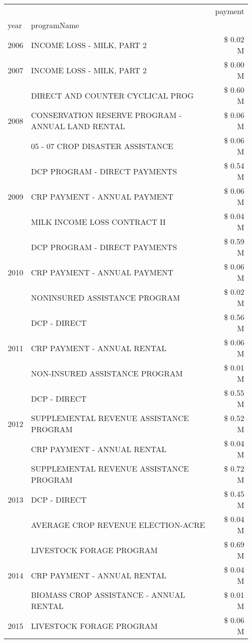 \begin{tabular}{llr}
\toprule
 &  & payment \\
year & programName &  \\
\midrule
2006 & INCOME LOSS - MILK, PART 2 & \$ 0.02 M \\
\cline{1-3}
2007 & INCOME LOSS - MILK, PART 2 & \$ 0.00 M \\
\cline{1-3}
\multirow[t]{3}{*}{2008} & DIRECT AND COUNTER CYCLICAL PROG & \$ 0.60 M \\
 & CONSERVATION RESERVE PROGRAM - ANNUAL LAND RENTAL & \$ 0.06 M \\
 & 05 - 07 CROP DISASTER ASSISTANCE & \$ 0.06 M \\
\cline{1-3}
\multirow[t]{3}{*}{2009} & DCP PROGRAM - DIRECT PAYMENTS & \$ 0.54 M \\
 & CRP PAYMENT - ANNUAL PAYMENT & \$ 0.06 M \\
 & MILK INCOME LOSS CONTRACT II & \$ 0.04 M \\
\cline{1-3}
\multirow[t]{3}{*}{2010} & DCP PROGRAM - DIRECT PAYMENTS & \$ 0.59 M \\
 & CRP PAYMENT - ANNUAL PAYMENT & \$ 0.06 M \\
 & NONINSURED ASSISTANCE PROGRAM & \$ 0.02 M \\
\cline{1-3}
\multirow[t]{3}{*}{2011} & DCP - DIRECT & \$ 0.56 M \\
 & CRP PAYMENT - ANNUAL RENTAL & \$ 0.06 M \\
 & NON-INSURED ASSISTANCE PROGRAM & \$ 0.01 M \\
\cline{1-3}
\multirow[t]{3}{*}{2012} & DCP - DIRECT & \$ 0.55 M \\
 & SUPPLEMENTAL REVENUE ASSISTANCE PROGRAM & \$ 0.52 M \\
 & CRP PAYMENT - ANNUAL RENTAL & \$ 0.04 M \\
\cline{1-3}
\multirow[t]{3}{*}{2013} & SUPPLEMENTAL REVENUE ASSISTANCE PROGRAM & \$ 0.72 M \\
 & DCP - DIRECT & \$ 0.45 M \\
 & AVERAGE CROP REVENUE ELECTION-ACRE & \$ 0.04 M \\
\cline{1-3}
\multirow[t]{3}{*}{2014} & LIVESTOCK FORAGE PROGRAM & \$ 0.69 M \\
 & CRP PAYMENT - ANNUAL RENTAL & \$ 0.04 M \\
 & BIOMASS CROP ASSISTANCE - ANNUAL RENTAL & \$ 0.01 M \\
\cline{1-3}
\multirow[t]{3}{*}{2015} & LIVESTOCK FORAGE PROGRAM & \$ 0.06 M \\

\end{tabular}
